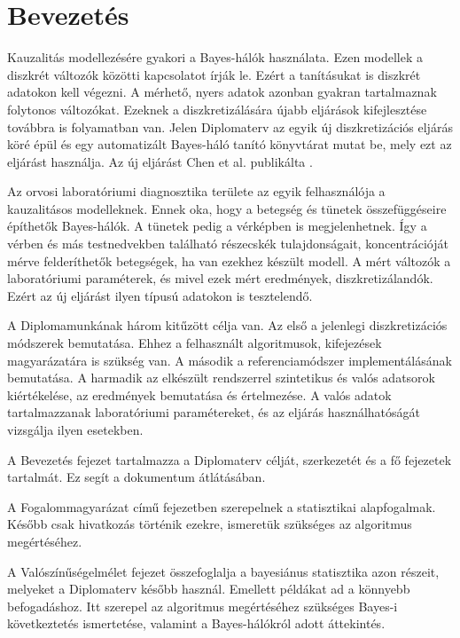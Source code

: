 \chapter*{Bevezetés}
Kauzalitás modellezésére gyakori a Bayes-hálók használata. Ezen modellek a diszkrét változók közötti kapcsolatot írják le. Ezért a tanításukat is diszkrét adatokon kell végezni. A mérhető, nyers adatok azonban gyakran tartalmaznak folytonos változókat. Ezeknek a diszkretizálására újabb eljárások kifejlesztése továbbra is folyamatban van. Jelen Diplomaterv az egyik új diszkretizációs eljárás köré épül és egy automatizált Bayes-háló tanító könyvtárat mutat be, mely ezt az eljárást használja. Az új eljárást Chen et al. publikálta \cite{chen2017learning}.

Az orvosi laboratóriumi diagnosztika területe az egyik felhasználója a kauzalitásos modelleknek. Ennek oka, hogy a betegség és tünetek összefüggéseire építhetők Bayes-hálók. A tünetek pedig a vérképben is megjelenhetnek. Így a vérben és más testnedvekben található részecskék tulajdonságait, koncentrációját mérve felderíthetők betegségek, ha van ezekhez készült modell. A mért változók a laboratóriumi paraméterek, és mivel ezek mért eredmények, diszkretizálandók. Ezért az új eljárást ilyen típusú adatokon is tesztelendő.

A Diplomamunkának három kitűzött célja van. Az első a jelenlegi diszkretizációs módszerek bemutatása. Ehhez a felhasznált algoritmusok, kifejezések magyarázatára is szükség van. A második a referenciamódszer implementálásának bemutatása. A harmadik az elkészült rendszerrel szintetikus és valós adatsorok kiértékelése, az eredmények bemutatása és értelmezése. A valós adatok tartalmazzanak laboratóriumi paramétereket, és az eljárás használhatóságát vizsgálja ilyen esetekben.

A Bevezetés fejezet tartalmazza a Diplomaterv célját, szerkezetét és a fő fejezetek tartalmát. Ez segít a dokumentum átlátásában.

A Fogalommagyarázat című fejezetben szerepelnek a statisztikai alapfogalmak. Később csak hivatkozás történik ezekre, ismeretük szükséges az algoritmus megértéséhez.

A Valószínűségelmélet fejezet összefoglalja a bayesiánus statisztika azon részeit, melyeket a Diplomaterv később használ. Emellett példákat ad a könnyebb befogadáshoz. Itt szerepel az algoritmus megértéséhez szükséges Bayes-i következtetés ismertetése, valamint a Bayes-hálókról adott áttekintés.

